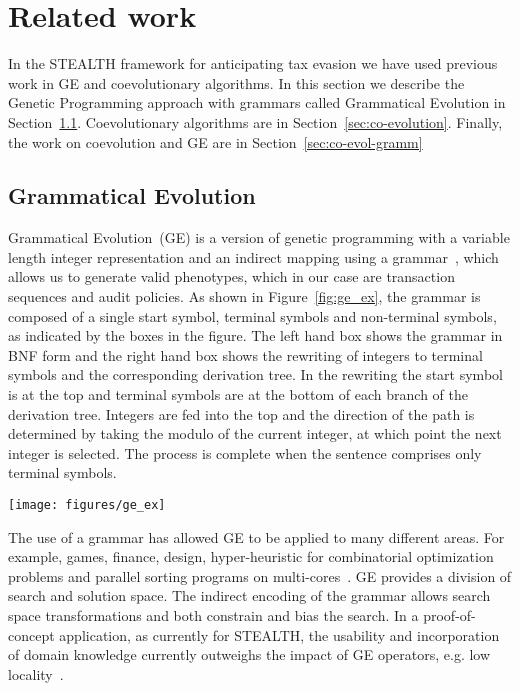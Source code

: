 \section{Related work}
\label{sec:related-work}

In the STEALTH framework for anticipating tax evasion we have used
previous work in GE and coevolutionary algorithms. In this section we
describe the Genetic Programming approach with grammars called
Grammatical Evolution in Section~\ref{sec:gramm-evol}. Coevolutionary
algorithms are in Section~\ref{sec:co-evolution}. Finally, the work on
coevolution and GE are in Section~\ref{sec:co-evol-gramm}

\subsection{Grammatical Evolution}
\label{sec:gramm-evol}

Grammatical Evolution~(GE) is a version of genetic programming with a
variable length integer representation and an indirect mapping using a
grammar~\citep{o2003grammatical}, which allows us to generate valid
phenotypes, which in our case are transaction sequences and audit
policies. As shown in Figure~\ref{fig:ge_ex}, the grammar is composed
of a single start symbol, terminal symbols and non-terminal symbols,
as indicated by the boxes in the figure. The left hand box shows the
grammar in BNF form and the right hand box shows the rewriting of
integers to terminal symbols and the corresponding derivation tree. In
the rewriting the start symbol is at the top and terminal symbols are
at the bottom of each branch of the derivation tree. Integers are fed
into the top and the direction of the path is determined by taking the
modulo of the current integer, at which point the next integer is
selected. The process is complete when the sentence comprises only
terminal symbols.

\begin{figure*}[!htb]
\centering \texttt{[image: figures/ge\_ex]}
\caption{{\small Example of how GE rewrites a list of integers
    (Genotype) into a list of transactions (Phenotype) with a BNF
    grammar}}
\label{fig:ge_ex}
\end{figure*}

The use of a grammar has allowed GE to be applied to many different
areas. For example, games, finance, design, hyper-heuristic for
combinatorial optimization problems and parallel sorting programs on
multi-cores~\citep{shaker2012evolving, dempsey2009foundations,
  byrne2014evolving, sabar2013grammatical,
  chennupati2015automatic}. GE provides a division of search and
solution space. The indirect encoding of the grammar allows search
space transformations and both constrain and bias the search. In a
proof-of-concept application, as currently for STEALTH, the usability
and incorporation of domain knowledge currently outweighs the impact
of GE operators, e.g. low locality~\citep{thorhauer2014locality,
  whigham2015examining}.

